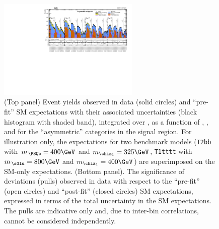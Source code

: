\begin{figure}[!h]
  \begin{center}
    \includegraphics[angle=90,width=0.6\textwidth]{figures/result/v1/summaryPlot_Asymmetric_prefit_overlay_fit_b}
    \caption{(Top panel) Event yields observed in data (solid circles)
      and ``pre-fit'' SM expectations with their associated
      uncertainties (black histogram with shaded band), integrated
      over \HTmiss, as a function of \njet, \nb, and \scalht for the
      ``asymmetric'' \njet categories in the signal region. For
      illustration only, the expectations for two benchmark models
      (\texttt{T2bb} with $m_{\,\PSQb} = 400\GeV$ and $m_{\chiz_1} =
      325\GeV$, \texttt{T1tttt} with $m_{\,\sGlu} = 800\GeV$ and
      $m_{\chiz_1} = 400\GeV$) are superimposed on the SM-only
      expectations. (Bottom panel). The significance of deviations
      (pulls) observed in data with respect to the ``pre-fit'' (open
      circles) and ``post-fit'' (closed circles) SM expectations,
      expressed in terms of the total uncertainty in the SM
      expectations. The pulls are indicative only and, due to
      inter-bin correlations, cannot be considered independently.} 
    \label{fig:asym}
  \end{center}
\end{figure}

